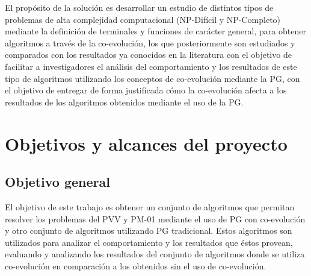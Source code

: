 El propósito de la solución es desarrollar un estudio de distintos tipos de problemas de alta complejidad computacional (NP-Difícil y NP-Completo) mediante la definición de terminales y funciones de carácter general, para obtener algoritmos a través de la co-evolución, los que posteriormente son estudiados y comparados con los resultados ya conocidos en la literatura con el objetivo de facilitar a investigadores el análisis del comportamiento y los resultados de este tipo de algoritmos utilizando los conceptos de co-evolución mediante la PG, con el objetivo de entregar de forma justificada cómo la co-evolución afecta a los resultados de los algoritmos obtenidos mediante el uso de la PG.


\section{Objetivos y alcances del proyecto}
\label{intro:objetivos}


\subsection{Objetivo general}

El objetivo de este trabajo es obtener un conjunto de algoritmos que permitan resolver los problemas del PVV y PM-01 mediante el uso de PG con co-evolución y otro conjunto de algoritmos utilizando PG tradicional. Estos algoritmos son utilizados para analizar el comportamiento y los resultados que éstos provean, evaluando y analizando los resultados del conjunto de algoritmos donde se utiliza co-evolución en comparación a los obtenidos sin el uso de co-evolución.


